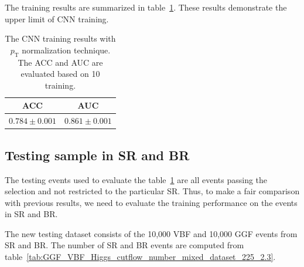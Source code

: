 \documentclass[12pt]{article}
\begin{document}
    The training results are summarized in table~\ref{tab:supervised_CNN_training_results}. These results demonstrate the upper limit of CNN training.
    \begin{table}[htpb]
        \centering
        \caption{The CNN training results with $p_{\text{T}}$ normalization technique. The ACC and AUC are evaluated based on 10 training.}
        \label{tab:supervised_CNN_training_results}
        \begin{tabular}{c|c}
             ACC               & AUC               \\ \hline
             $0.784 \pm 0.001$ & $0.861 \pm 0.001$ \\
        \end{tabular}
    \end{table}

    \subsection{Testing sample in SR and BR}%
    \label{sub:testing_sample_in_sr_and_br}
        The testing events used to evaluate the table~\ref{tab:supervised_CNN_training_results} are all events passing the selection and not restricted to the particular SR. Thus, to make a fair comparison with previous results, we need to evaluate the training performance on the events in SR and BR.

        The new testing dataset consists of the 10,000 VBF and 10,000 GGF events from SR and BR. The number of SR and BR events are computed from table~\ref{tab:GGF_VBF_Higgs_cutflow_number_mixed_dataset_225_2.3}.
\end{document}
